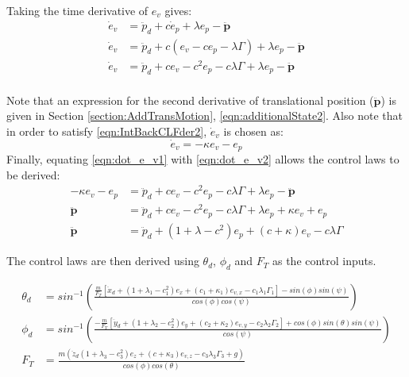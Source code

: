 Taking the time derivative of $e_{v}$ gives:
\begin{equation}\label{eqn:dot_e_v1}
\begin{split}
\dot{e}_{v}&=\ddot{p}_{d}+c\dot{e}_{p}+\lambda e_{p} - \mathbf{\ddot{p}}\\
\dot{e}_{v}&=\ddot{p}_{d}+c(e_{v}-ce_{p}-\lambda\Gamma)+\lambda e_{p} - \mathbf{\ddot{p}}\\
\dot{e}_{v}&=\ddot{p}_{d}+ce_{v}-c^{2}e_{p}-c\lambda\Gamma+\lambda e_{p} - \mathbf{\ddot{p}}\\
\end{split}
\end{equation} 

Note that an expression for the second derivative of translational position ($\mathbf{\ddot{p}}$) is given in Section \ref{section:AddTransMotion}, \eqref{eqn:additionalState2}. Also note that in order to satisfy \eqref{eqn:IntBackCLFder2}, $\dot{e}_{v}$ is chosen as:
\begin{equation}\label{eqn:dot_e_v2}
\dot{e}_{v}=-\kappa e_{v} - e_{p}
\end{equation}
Finally, equating \eqref{eqn:dot_e_v1} with \eqref{eqn:dot_e_v2} allows the control laws to be derived:
\begin{equation}\label{eqn:dot_e_v3}
\begin{split}
-\kappa e_{v} - e_{p}&=\ddot{p}_{d}+ce_{v}-c^{2}e_{p}-c\lambda\Gamma+\lambda e_{p} - \mathbf{\ddot{p}}\\
\mathbf{\ddot{p}}&=\ddot{p}_{d}+ce_{v}-c^{2}e_{p}-c\lambda\Gamma+\lambda e_{p} +\kappa e_{v} + e_{p}\\
\mathbf{\ddot{p}}&=\ddot{p}_{d}+(1+\lambda-c^{2})e_{p}+(c+\kappa)e_{v}-c\lambda\Gamma
\end{split}
\end{equation}

The control laws are then derived using $\theta_{d}$, $\phi_{d}$ and $F_{T}$ as the control inputs.

 \begin{equation}\label{eqn:IntBackContLaws}
\begin{split}
\theta_{d}&=sin^{-1}\left(\frac{\frac{m}{F_{T}}[\ddot{x}_{d}+(1+\lambda_{1}-c_{1}^{2})e_{x}+(c_{1}+\kappa_{1})e_{v,x}-c_{1}\lambda_{1}\Gamma_{1}]-sin(\phi)sin(\psi)}{cos(\phi)cos(\psi)}\right)\\
\phi_{d}&=sin^{-1}\left(\frac{-\frac{m}{F_{T}}[\ddot{y}_{d}+(1+\lambda_{2}-c_{2}^{2})e_{y}+(c_{2}+\kappa_{2})e_{v,y}-c_{2}\lambda_{2}\Gamma_{2}]+cos(\phi)sin(\theta)sin(\psi)}{cos(\psi)}\right)\\
F_{T}&=\frac{m(\ddot{z}_{d}(1+\lambda_{3}-c_{3}^{2})e_{z}+(c+\kappa_{3})e_{v,z}-c_{3}\lambda_{3}\Gamma_{3}+g)}{cos(\phi)cos(\theta)}
\end{split}
\end{equation}




